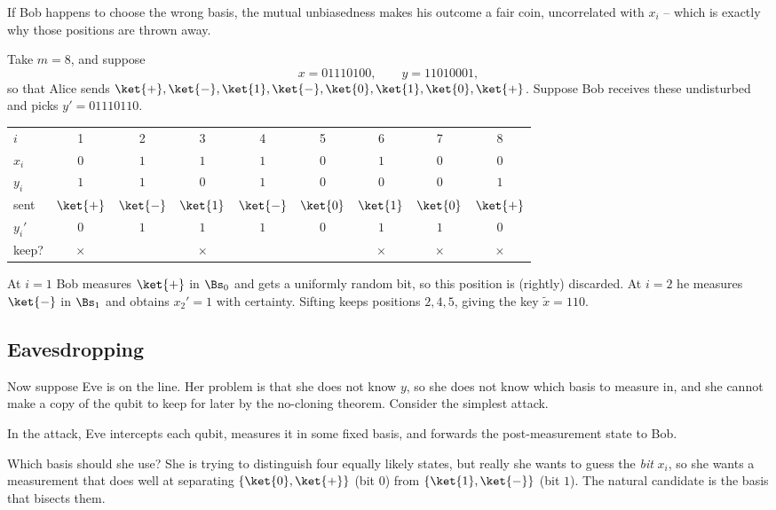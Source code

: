 If Bob happens to choose the wrong basis, the mutual unbiasedness makes his outcome a fair coin, uncorrelated with $x_i$ -- which is exactly why those positions are thrown away.

\begin{example}
	Take $m = 8$, and suppose
	$$x = 01110100, \qquad y = 11010001,$$
	so that Alice sends $\ket{+},\ket{-},\ket{1},\ket{-},\ket{0},\ket{1},\ket{0},\ket{+}$. Suppose Bob receives these undisturbed and picks $y' = 01110110$.
	\begin{center}
	\begin{tabular}{l c c c c c c c c}
		$i$ & 1 & 2 & 3 & 4 & 5 & 6 & 7 & 8 \\[2pt]
		$x_i$ & $0$ & $1$ & $1$ & $1$ & $0$ & $1$ & $0$ & $0$\\
		$y_i$ & $1$ & $1$ & $0$ & $1$ & $0$ & $0$ & $0$ & $1$ \\
		sent & $\ket{+}$ & $\ket{-}$ & $\ket{1}$ & $\ket{-}$ & $\ket{0}$ & $\ket{1}$ & $\ket{0}$ & $\ket{+}$\\
		$y_i'$ & $0$ & $1$ & $1$ & $1$ & $0$ & $1$ & $1$ & $0$ \\
		keep? & $\times$ & \checkmark & $\times$ & \checkmark & \checkmark & $\times$ & $\times$ & $\times$
	\end{tabular}
	\end{center}
	At $i = 1$ Bob measures $\ket{+}$ in $\Bs_0$ and gets a uniformly random bit, so this position is (rightly) discarded. At $i = 2$ he measures $\ket{-}$ in $\Bs_1$ and obtains $x_2' = 1$ with certainty. Sifting keeps positions $2, 4, 5$, giving the key $\widetilde x = 110$.
\end{example}

\subsection{Eavesdropping}

Now suppose Eve is on the line. Her problem is that she does not know $y$, so she does not know which basis to measure in, and she cannot make a copy of the qubit to keep for later by the no-cloning theorem. Consider the simplest attack.

\begin{definition}
	In the  attack, Eve intercepts each qubit, measures it in some fixed basis, and forwards the post-measurement state to Bob.
\end{definition}

Which basis should she use? She is trying to distinguish four equally likely states, but really she wants to guess the \emph{bit} $x_i$, so she wants a measurement that does well at separating $\{\ket{0},\ket{+}\}$ (bit $0$) from $\{\ket{1},\ket{-}\}$ (bit $1$). The natural candidate is the basis that bisects them.

